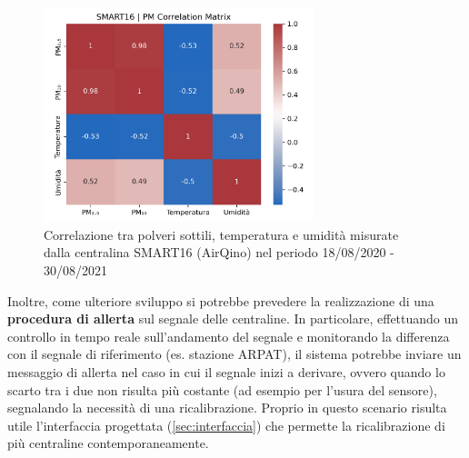 \begin{figure}[H]
\centering
\captionsetup{justification=centering}
\includegraphics[width=0.70\textwidth,height=\textheight,keepaspectratio]{img/corr}
\caption{Correlazione tra polveri sottili, temperatura e umidità misurate dalla centralina SMART16 (AirQino) nel periodo 18/08/2020 - 30/08/2021}
\label{fig:corr}
\end{figure}

Inoltre, come ulteriore sviluppo si potrebbe prevedere la realizzazione di una \textbf{procedura di allerta} sul segnale delle centraline. In particolare, effettuando un controllo in tempo reale sull'andamento del segnale e monitorando la differenza con il segnale di riferimento (es. stazione ARPAT), il sistema potrebbe inviare un messaggio di allerta nel caso in cui il segnale inizi a derivare, ovvero quando lo scarto tra i due non risulta più costante (ad esempio per l'usura del sensore), segnalando la necessità di una ricalibrazione. Proprio in questo scenario risulta utile l'interfaccia progettata (\ref{sec:interfaccia}) che permette la ricalibrazione di più centraline contemporaneamente.

